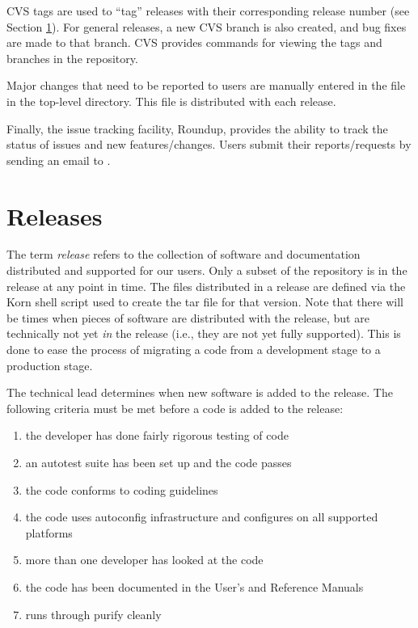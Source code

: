CVS tags are used to ``tag'' releases with their corresponding release
number (see Section \ref{Releases}).  For general releases, a new CVS
branch is also created, and bug fixes are made to that branch.  CVS
provides commands for viewing the tags and branches in the repository.

Major changes that need to be reported to users are manually entered
in the  file in the top-level directory.  This file is
distributed with each \hypre{} release.

Finally, the \hypre{} issue tracking facility, Roundup, provides
the ability to track the status of issues and new features/changes.
Users submit their reports/requests by sending an email to 
.


\section{Releases}
\label{Releases}

The term \hypre{} {\em release} refers to the collection of software
and documentation distributed and supported for our users.  Only a
subset of the repository is in the \hypre{} release at any point in
time.  The files distributed in a release are defined via the Korn
shell script  used to create the tar file for that
version.  Note that there will be times when pieces of software are 
distributed with the release, but are technically not yet {\em in} 
the release (i.e., they are not yet fully supported).  This is done 
to ease the process of migrating a code from a development stage to 
a production stage.

The \hypre{} technical lead determines when new software is added to
the release.  The following criteria must be met before a code is
added to the release:
\begin{enumerate}

\item the developer has done fairly rigorous testing of code
\item an autotest suite has been set up and the code passes
\item the code conforms to coding guidelines
\item the code uses autoconfig infrastructure and configures on all
supported platforms
\item more than one developer has looked at the code
\item the code has been documented in the User's and Reference Manuals
\item runs through purify cleanly

\end{enumerate}

